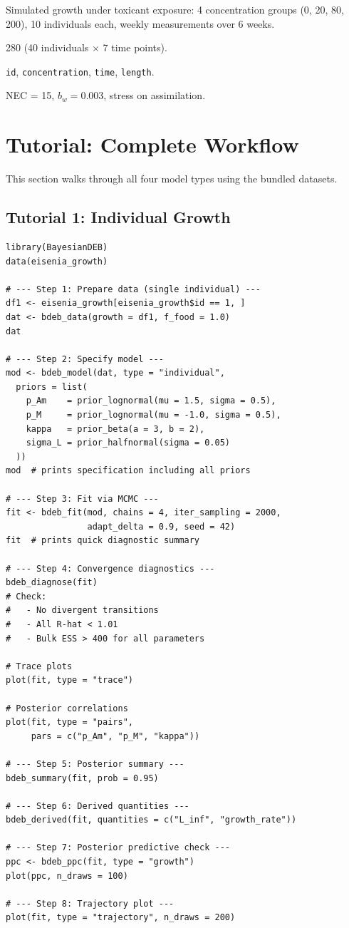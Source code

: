\documentclass[11pt,a4paper]{article}
\newcommand{\code}[1]{\texttt{#1}}
\begin{document}
Simulated growth under toxicant exposure: 4 concentration groups (0, 20,
80, 200), 10 individuals each, weekly measurements over 6 weeks.

\begin{description}[nosep,leftmargin=3cm]
  \item[Rows] 280 (40 individuals $\times$ 7 time points).
  \item[Columns] \code{id}, \code{concentration}, \code{time}, \code{length}.
  \item[True parameters] NEC = 15, $b_w = 0.003$, stress on assimilation.
\end{description}


\section{Tutorial: Complete Workflow}
\label{sec:tutorial}

This section walks through all four model types using the bundled
datasets.

\subsection{Tutorial 1: Individual Growth}
\label{sec:tut-individual}

\begin{lstlisting}
library(BayesianDEB)
data(eisenia_growth)

# --- Step 1: Prepare data (single individual) ---
df1 <- eisenia_growth[eisenia_growth$id == 1, ]
dat <- bdeb_data(growth = df1, f_food = 1.0)
dat

# --- Step 2: Specify model ---
mod <- bdeb_model(dat, type = "individual",
  priors = list(
    p_Am    = prior_lognormal(mu = 1.5, sigma = 0.5),
    p_M     = prior_lognormal(mu = -1.0, sigma = 0.5),
    kappa   = prior_beta(a = 3, b = 2),
    sigma_L = prior_halfnormal(sigma = 0.05)
  ))
mod  # prints specification including all priors

# --- Step 3: Fit via MCMC ---
fit <- bdeb_fit(mod, chains = 4, iter_sampling = 2000,
                adapt_delta = 0.9, seed = 42)
fit  # prints quick diagnostic summary

# --- Step 4: Convergence diagnostics ---
bdeb_diagnose(fit)
# Check:
#   - No divergent transitions
#   - All R-hat < 1.01
#   - Bulk ESS > 400 for all parameters

# Trace plots
plot(fit, type = "trace")

# Posterior correlations
plot(fit, type = "pairs",
     pars = c("p_Am", "p_M", "kappa"))

# --- Step 5: Posterior summary ---
bdeb_summary(fit, prob = 0.95)

# --- Step 6: Derived quantities ---
bdeb_derived(fit, quantities = c("L_inf", "growth_rate"))

# --- Step 7: Posterior predictive check ---
ppc <- bdeb_ppc(fit, type = "growth")
plot(ppc, n_draws = 100)

# --- Step 8: Trajectory plot ---
plot(fit, type = "trajectory", n_draws = 200)
\end{lstlisting}
\end{document}
